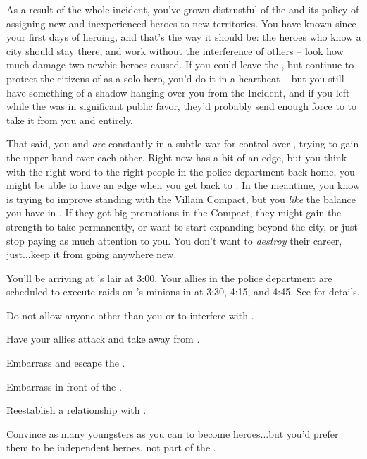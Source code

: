 \documentclass[char]{LRSguildcamp1}
\begin{document}
As a result of the whole incident, you've grown distrustful of the \cHeroLeague{\intro} and its policy of assigning new and inexperienced heroes to new territories.  You have known \pCityO{} since your first days of heroing, and that's the way it should be: the heroes who know a city should stay there, and work without the interference of others -- look how much damage two newbie heroes caused.  If you could leave the \cHeroLeague{}, but continue to protect the citizens of \pCityO{} as a solo hero, you'd do it in a heartbeat -- but you still have something of a shadow hanging over you from the \pCityO{} Incident, and if you left while the \cHeroLeague{} was in significant public favor, they'd probably send enough force to \pCityO{} to take it from you and \cOldest{} entirely.


That said, you and \cOldest{} \emph{are} constantly in a subtle war for control over \pCityO{}, trying to gain the upper hand over each other.  Right now \cOldest{} has a bit of an edge, but you think with the right word to the right people in the police department back home, you might be able to have an edge when you get back to \pCityO{}.  In the meantime, you know \cOldest{} is trying to improve \cOldest{\their} standing with the Villain Compact, but you {\em like} the balance you have in \pCityO{}.  If they got big promotions in the Compact, they might gain the strength to take \pCityO{} permanently, or want to start expanding beyond the city, or just stop paying as much attention to you.  You don't want to {\em destroy} their career, just...keep it from going anywhere new.

You'll be arriving at \cGrandma{}'s lair at 3:00.  Your allies in the police department are scheduled to execute raids on \cOldest{}'s minions in \pCityO{} at 3:30, 4:15, and 4:45.  See \gAttackCities{} for details.

\begin{itemz}[Goals]
	\item Do not allow anyone other than you or \cOldest{} to interfere with \pCityO{}.  %
	\item Have your allies attack and take \pCityO{} away from \cOldest{}.
	\item Embarrass and escape the \cHeroLeague{\intro}.
	\item Embarrass \cOldest{} in front of the \cVillainCompact{\intro}.
	\item Reestablish a relationship with \cGrad{}.
	\item Convince as many youngsters as you can to become heroes...but you'd prefer them to be independent heroes, not part of the \cHeroLeague{}.
\end{itemz}
\end{document}
